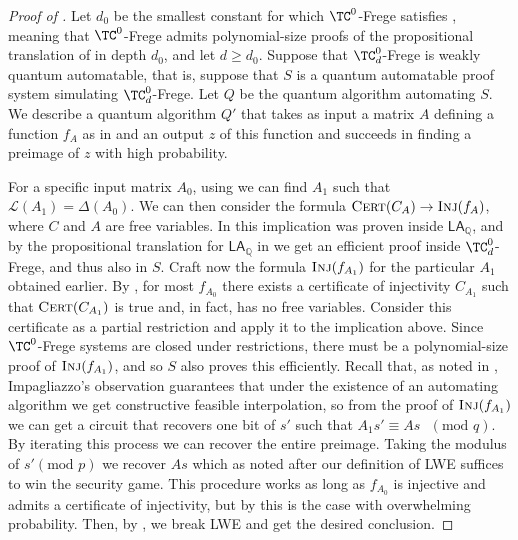 \documentclass[11pt]{article}
\newcommand{\LAQ}{\mathsf{LA}_\mathbb{Q}}
\theoremstyle{definition}
\theoremstyle{plain}
\theoremstyle{remark}
\newcommand{\LL}{\mathcal{L}}
\begin{document}
\begin{proof}[Proof of ]
Let $d_0$ be the smallest constant for which $\TC^0$-Frege satisfies , meaning that $\TC^0$-Frege admits polynomial-size proofs of the propositional translation of  in depth $d_0$, and let $d \geq d_0$. Suppose that $\TC^0_d$-Frege is weakly quantum automatable, that is, suppose that $S$ is a quantum automatable proof system simulating $\TC^0_d$-Frege. Let $Q$ be the quantum algorithm automating $S$. We describe a quantum algorithm $Q'$ that takes as input a matrix $A$ defining a function $f_A$ as in  and an output $z$ of this function and succeeds in finding a preimage of $z$ with high probability.

For a specific input matrix $A_0$, using  we can find $A_1$ such that $\LL(A_1) = \Delta(A_0)$. We can then consider the formula $\operatorname{\textsc{Cert}}(C_A) \to \operatorname{\textsc{Inj}}(f_A)$, where $C$ and $A$ are free variables. In  this implication was proven inside $\LAQ$, and by the propositional translation for $\LAQ$ in  we get an efficient proof inside $\TC^0_d$-Frege, and thus also in $S$. Craft now the formula $\operatorname{\textsc{Inj}}(f_{A_1})$ for the particular $A_1$ obtained earlier. By , for most $f_{A_0}$ there exists a certificate of injectivity $C_{A_1}$ such that $\operatorname{\textsc{Cert}}(C_{A_1})$ is true and, in fact, has no free variables. Consider this certificate as a partial restriction and apply it to the implication above. Since $\TC^0$-Frege systems are closed under restrictions, there must be a polynomial-size proof of $\operatorname{\textsc{Inj}}(f_{A_1})$, and so $S$ also proves this efficiently. Recall that, as noted in , Impagliazzo's observation guarantees that under the existence of an automating algorithm we get constructive feasible interpolation, so from the proof of $\operatorname{\textsc{Inj}}(f_{A_1})$ we can get a circuit that recovers one bit of $s'$ such that $A_1s' \equiv As \text{ }(\text{mod } q)$. By iterating this process we can recover the entire preimage. Taking the modulus of $s' (\text{mod } p)$ we recover $As$ which as noted after our definition of LWE suffices to win the security game. This procedure works as long as $f_{A_0}$ is injective and admits a certificate of injectivity, but by  this is the case with overwhelming probability. Then, by , we break LWE and get the desired conclusion.
\end{proof}
\end{document}
